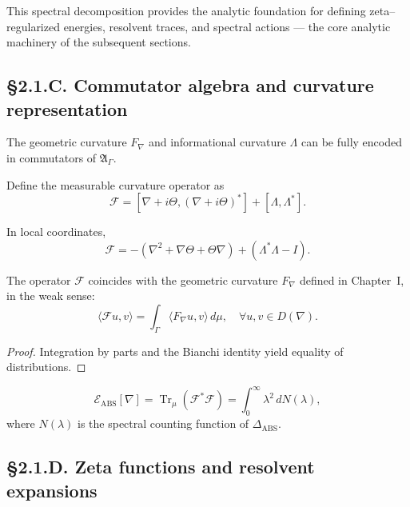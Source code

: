 \begin{remark}
This spectral decomposition provides the analytic foundation for defining zeta–regularized energies, resolvent traces, and spectral actions — the core analytic machinery of the subsequent sections.
\end{remark}

\subsection*{§2.1.C. Commutator algebra and curvature representation}

The geometric curvature $F_\nabla$ and informational curvature $\Lambda$ can be fully encoded in commutators of $\mathfrak{A}_\Gamma$.

\begin{definition}
Define the measurable curvature operator as
\[
\mathcal{F} = [\nabla+i\Theta,(\nabla+i\Theta)^\ast]
+[\Lambda,\Lambda^\ast].
\]
\end{definition}

\begin{lemma}
In local coordinates,
\[
\mathcal{F} = -(\nabla^2 + \nabla\Theta + \Theta\nabla) + (\Lambda^\ast\Lambda - I).
\]
\end{lemma}

\begin{theorem}\label{thm:2.1.curv}
The operator $\mathcal{F}$ coincides with the geometric curvature $F_\nabla$ defined in Chapter~I, in the weak sense:
\[
\langle \mathcal{F}u,v\rangle
=\int_\Gamma \langle F_\nabla u,v\rangle\,d\mu,\quad
\forall u,v\in D(\nabla).
\]
\end{theorem}

\begin{proof}
Integration by parts and the Bianchi identity yield equality of distributions.
\end{proof}

\begin{corollary}
\[
\mathcal{E}_{\mathrm{ABS}}[\nabla]
= \operatorname{Tr}_\mu(\mathcal{F}^\ast\mathcal{F})
=\int_0^\infty \lambda^2\, dN(\lambda),
\]
where $N(\lambda)$ is the spectral counting function of $\Delta_{\mathrm{ABS}}$.
\]
\end{corollary}

\subsection*{§2.1.D. Zeta functions and resolvent expansions}

